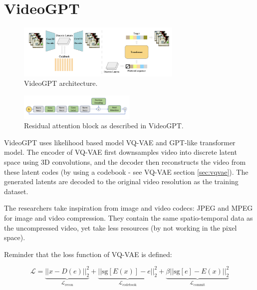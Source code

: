 \section{VideoGPT}

\begin{figure}
    \centering
    \includegraphics[width=0.7\textwidth]{images/video_synthesis/videogpt_architecture.png}
    \caption{VideoGPT architecture.}
\end{figure}

\begin{figure}
    \centering
    \includegraphics[width=0.5\textwidth]{images/video_synthesis/videogpt_res_atten_block.png}
    \caption{Residual attention block as described in VideoGPT.}
    \label{fig:videogpt_res_atten_block}
\end{figure}

VideoGPT \cite{videogpt} uses likelihood based model VQ-VAE and GPT-like transformer model. The encoder of VQ-VAE first downsamples video into discrete latent space using 3D convolutions, and the decoder then reconstructs the video from these latent codes (by using a codebook - see VQ-VAE section \ref{sec:vqvae}). The generated latents are decoded to the original video resolution as the training dataset.

The researchers take inspiration from image and video codecs: JPEG and MPEG for image and video compression. They contain the same spatio-temporal data as the uncompressed video, yet take less resources (by not working in the pixel space).

Reminder that the loss function of VQ-VAE is defined:

\begin{equation*}
    \mathcal{L} = \underbrace{\left| \left| x - D(e) \right| \right|^2_2}_{\mathcal{L}_\text{recon}} + \underbrace{\left| \left| \text{sg}\left[ E(x) \right] - e \right| \right|^2_2}_{\mathcal{L}_\text{codebook}} + \underbrace{\beta \left| \left| \text{sg}[e] - E(x) \right| \right|^2_2}_{\mathcal{L}_\text{commit}}
\end{equation*}

